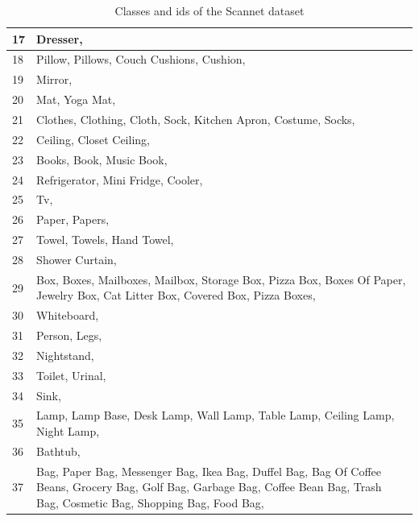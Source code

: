 \begin{table}[h]
\begin{center}
\begin{tabular}{ | l | p{14cm} |}
    			17 & Dresser, \\ \hline
    			18 & Pillow, Pillows, Couch Cushions, Cushion, \\ \hline
    			19 & Mirror, \\ \hline
    			20 & Mat, Yoga Mat, \\ \hline
    			21 & Clothes, Clothing, Cloth, Sock, Kitchen Apron, Costume, Socks, \\ \hline
    			22 & Ceiling, Closet Ceiling, \\ \hline
    			23 & Books, Book, Music Book, \\ \hline
    			24 & Refrigerator, Mini Fridge, Cooler, \\ \hline
    			25 & Tv, \\ \hline
    			26 & Paper, Papers, \\ \hline
    			27 & Towel, Towels, Hand Towel, \\ \hline
    			28 & Shower Curtain, \\ \hline
    			29 & Box, Boxes, Mailboxes, Mailbox, Storage Box, Pizza Box, Boxes Of Paper, Jewelry Box, Cat Litter Box, Covered Box, Pizza Boxes, \\ \hline
    			30 & Whiteboard, \\ \hline
    			31 & Person, Legs, \\ \hline
    			32 & Nightstand, \\ \hline
    			33 & Toilet, Urinal, \\ \hline
    			34 & Sink, \\ \hline
    			35 & Lamp, Lamp Base, Desk Lamp, Wall Lamp, Table Lamp, Ceiling Lamp, Night Lamp, \\ \hline
    			36 & Bathtub, \\ \hline
    			37 & Bag, Paper Bag, Messenger Bag, Ikea Bag, Duffel Bag, Bag Of Coffee Beans, Grocery Bag, Golf Bag, Garbage Bag, Coffee Bean Bag, Trash Bag, Cosmetic Bag, Shopping Bag, Food Bag, \\ \hline
    			
    			\hline
    		\end{tabular}
    		\caption{Classes and ids of the Scannet dataset}
    		\label{table:Classes in scannet_1}
    		
    	\end{center}
    \end{table}
    
